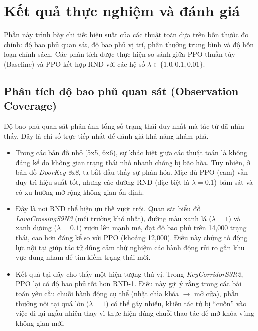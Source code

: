 \documentclass{uetgraduation}
\begin{document}
\section{Kết quả thực nghiệm và đánh giá}

Phần này trình bày chi tiết hiệu suất của các thuật toán dựa trên bốn thước đo chính: độ bao phủ quan sát, độ bao phủ vị trí, phần thưởng trung bình và độ hỗn loạn chính sách. Các phân tích được thực hiện so sánh giữa PPO thuần túy (Baseline) và PPO kết hợp RND với các hệ số $\lambda \in \{1.0, 0.1, 0.01\}$.

\subsection{Phân tích độ bao phủ quan sát (Observation Coverage)}

Độ bao phủ quan sát phản ánh tổng số trạng thái duy nhất mà tác tử đã nhìn thấy. Đây là chỉ số trực tiếp nhất để đánh giá khả năng khám phá.

\begin{itemize}
    \item Trong các bản đồ nhỏ (5x5, 6x6), sự khác biệt giữa các thuật toán là không đáng kể do không gian trạng thái nhỏ nhanh chóng bị bão hòa. Tuy nhiên, ở bản đồ \textit{DoorKey-8x8}, ta bắt đầu thấy sự phân hóa. Mặc dù PPO (cam) vẫn duy trì hiệu suất tốt, nhưng các đường RND (đặc biệt là $\lambda=0.1$) bám sát và có xu hướng mở rộng không gian ổn định.
    
    \item Đây là nơi RND thể hiện ưu thế vượt trội. Quan sát biểu đồ \textit{LavaCrossingS9N3} (môi trường khó nhất), đường màu xanh lá ($\lambda=1$) và xanh dương ($\lambda=0.1$) vươn lên mạnh mẽ, đạt độ bao phủ trên 14,000 trạng thái, cao hơn đáng kể so với PPO (khoảng 12,000). Điều này chứng tỏ động lực nội tại giúp tác tử dũng cảm thử nghiệm các hành động rủi ro gần khu vực dung nham để tìm kiếm trạng thái mới.
    
    \item Kết quả tại đây cho thấy một hiện tượng thú vị. Trong \textit{KeyCorridorS3R2}, PPO lại có độ bao phủ tốt hơn RND-1. Điều này gợi ý rằng trong các bài toán yêu cầu chuỗi hành động cụ thể (nhặt chìa khóa $\rightarrow$ mở cửa), phần thưởng nội tại quá lớn ($\lambda=1$) có thể gây nhiễu, khiến tác tử bị ``cuốn'' vào việc đi lại ngẫu nhiên thay vì thực hiện đúng chuỗi thao tác để mở khóa vùng không gian mới.
\end{itemize}
\end{document}
